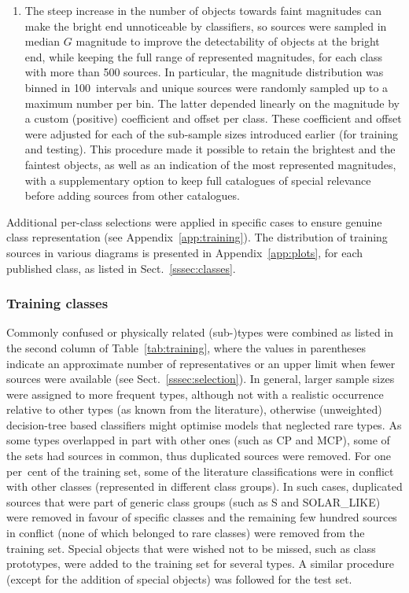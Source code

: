 \documentclass[longauth]{aa}
\def\g{$G$\xspace}
\begin{document}
\begin{enumerate}
    \item The steep increase in the number of objects towards faint magnitudes can make the bright end unnoticeable by classifiers, so sources were sampled in median \g magnitude to improve the detectability of objects at the bright end, while keeping the full range of represented magnitudes, for each class with more than 500 sources. 
    In particular, the magnitude distribution was binned in 100~intervals and unique sources were randomly sampled up to a maximum number per bin. The latter depended linearly on the magnitude  by a custom (positive) coefficient and offset per class. 
    These coefficient and offset were adjusted for each of the sub-sample sizes introduced earlier (for training and testing).
    This procedure made it possible to retain the brightest and the faintest objects, as well as an indication of the most represented magnitudes, with a supplementary option to keep full catalogues of special relevance before adding sources from other catalogues.
\end{enumerate} 

Additional per-class selections were applied in specific cases to ensure genuine class representation (see Appendix~\ref{app:training}).
The distribution of training sources in various diagrams is presented in Appendix~\ref{app:plots}, for each published class, as listed in Sect.~\ref{sssec:classes}. 


\subsubsection{Training classes\label{sssec:trainingclasses}}

Commonly confused or physically related (sub-)types were combined as listed in the second column of Table~\ref{tab:training}, where the values in parentheses indicate an approximate number of representatives or an upper limit when fewer sources were available (see Sect.~\ref{sssec:selection}). 
In general, larger sample sizes were assigned to more frequent types, although not with a realistic  occurrence relative to other types (as known from the literature), otherwise (unweighted) decision-tree based classifiers might optimise models that neglected rare types. As some types overlapped in part with other ones (such as CP and MCP), some of the sets had sources in common, thus duplicated sources were removed. For one per~cent of the training set, some of the literature classifications were in conflict with other classes (represented in different class groups). In such cases, duplicated sources that were part of generic class groups (such as S and SOLAR\_LIKE) were removed in favour of specific classes and the remaining few hundred sources in conflict (none of which belonged to rare classes) were removed from the training set. Special objects that were wished not to be missed, such as class prototypes, were added to the training set for several types.
A similar procedure (except for the addition of special objects) was followed for the test set.
\end{document}
